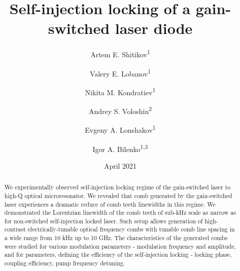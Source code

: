 \documentclass[a4paper, amsfonts, amssymb, amsmath, reprint, showkeys, nofootinbib, twoside,longbibliography, aps]{revtex4-1}
\begin{document}
\title{Self-injection locking of a gain-switched laser diode}



\author{Artem E. Shitikov\textsuperscript{1}}
\author{Valery E. Lobanov\textsuperscript{1}}%
\author{Nikita M. Kondratiev\textsuperscript{1}}
\author{Andrey S. Voloshin\textsuperscript{2}}
\author{Evgeny A. Lonshakov\textsuperscript{1}}
\author{Igor A. Bilenko\textsuperscript{1,3}}

\date{April 2021}




\begin{abstract}
We experimentally observed self-injection locking regime  of the gain-switched laser to high-Q optical microresonator. We revealed that comb generated by the gain-switched laser experiences a dramatic reduce of comb teeth linewidths in this regime. We demonstrated the Lorentzian linewidth of the comb teeth of sub-kHz scale as narrow as for non-switched self-injection locked laser. Such setup allows generation of high-contrast electrically-tunable optical frequency combs with tunable comb line spacing in a wide range from 10 kHz up to 10 GHz. The characteristics of the generated combs were studied for various modulation parameters - modulation frequency and amplitude, and for parameters, defining the efficiency of the self-injection locking - locking phase, coupling efficiency, pump frequency detuning. 
\end{abstract}

\maketitle
\end{document}
